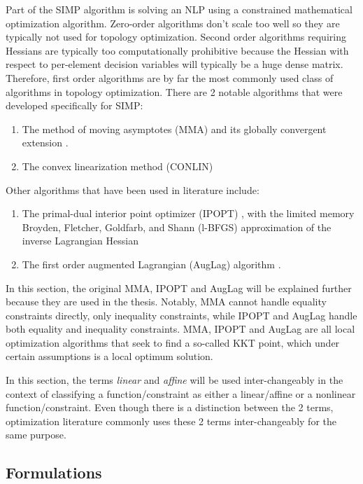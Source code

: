 Part of the SIMP algorithm is solving an NLP using a constrained mathematical optimization algorithm. Zero-order algorithms don't scale too well so they are typically not used for topology optimization. Second order algorithms requiring Hessians are typically too computationally prohibitive because the Hessian with respect to per-element decision variables will typically be a huge dense matrix. Therefore, first order algorithms are by far the most commonly used class of algorithms in topology optimization. There are 2 notable algorithms that were developed specifically for SIMP:
\begin{enumerate}
    \item The method of moving asymptotes (MMA) \citep{Svanberg1987} and its globally convergent extension \citep{Svanberg2002}.
    \item The convex linearization method (CONLIN) \citep{Fleury1989}
\end{enumerate}
Other algorithms that have been used in literature \citep{Rojas-Labanda2015,Pereira2004,tarek2021robust} include:
\begin{enumerate}
    \item The primal-dual interior point optimizer (IPOPT) \citep{Wachter2006}, with the limited memory Broyden, Fletcher, Goldfarb, and Shann (l-BFGS) approximation of the inverse Lagrangian Hessian \citep{Nocedal2006}
    \item The first order augmented Lagrangian (AugLag) algorithm \citep{Bertsekas1996}.
\end{enumerate}

In this section, the original MMA, IPOPT and AugLag will be explained further because they are used in the thesis. Notably, MMA cannot handle equality constraints directly, only inequality constraints, while IPOPT and AugLag handle both equality and inequality constraints. MMA, IPOPT and AugLag are all local optimization algorithms that seek to find a so-called KKT point, which under certain assumptions is a local optimum solution.

In this section, the terms \textit{linear} and \textit{affine} will be used inter-changeably in the context of classifying a function/constraint as either a linear/affine or a nonlinear function/constraint. Even though there is a distinction between the 2 terms, optimization literature commonly uses these 2 terms inter-changeably for the same purpose.

\subsection{Formulations}

